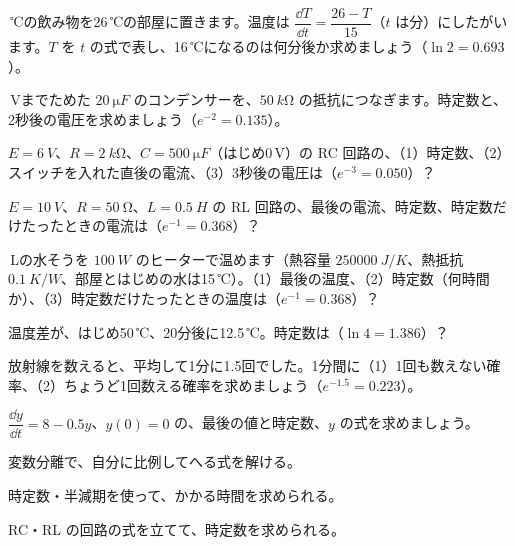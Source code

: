 \,℃の飲み物を26\,℃の部屋に置きます。温度は $\dfrac{\dd T}{\dd t}=\dfrac{26-T}{15}$（$t$ は分）にしたがいます。$T$ を $t$ の式で表し、16\,℃になるのは何分後か求めましょう（$\ln2=0.693$）。

\,Vまでためた $\qty{20}{\micro F}$ のコンデンサーを、$\qty{50}{k\ohm}$ の抵抗につなぎます。時定数と、2秒後の電圧を求めましょう（$e^{-2}=0.135$）。

\bkproblem $E=\qty{6}{V}$、$R=\qty{2}{k\ohm}$、$C=\qty{500}{\micro F}$（はじめ0\,V）の RC 回路の、（1）時定数、（2）スイッチを入れた直後の電流、（3）3秒後の電圧は（$e^{-3}=0.050$）？

\bkproblem $E=\qty{10}{V}$、$R=\qty{50}{\ohm}$、$L=\qty{0.5}{H}$ の RL 回路の、最後の電流、時定数、時定数だけたったときの電流は（$e^{-1}=0.368$）？


\,Lの水そうを $\qty{100}{W}$ のヒーターで温めます（熱容量 $\qty{250000}{J/K}$、熱抵抗 $\qty{0.1}{K/W}$、部屋とはじめの水は15\,℃）。（1）最後の温度、（2）時定数（何時間か）、（3）時定数だけたったときの温度は（$e^{-1}=0.368$）？

\bkproblem 温度差が、はじめ50\,℃、20分後に12.5\,℃。時定数は（$\ln4=1.386$）？

\bkproblem 放射線を数えると、平均して1分に1.5回でした。1分間に（1）1回も数えない確率、（2）ちょうど1回数える確率を求めましょう（$e^{-1.5}=0.223$）。

\bkproblem $\dfrac{\dd y}{\dd t}=8-0.5y$、$y(0)=0$ の、最後の値と時定数、$y$ の式を求めましょう。

\begin{furikaeri}
\begin{checklist}
\item 変数分離で、自分に比例してへる式を解ける。
\item 時定数・半減期を使って、かかる時間を求められる。
\item RC・RL の回路の式を立てて、時定数を求められる。
\end{checklist}
\end{furikaeri}

